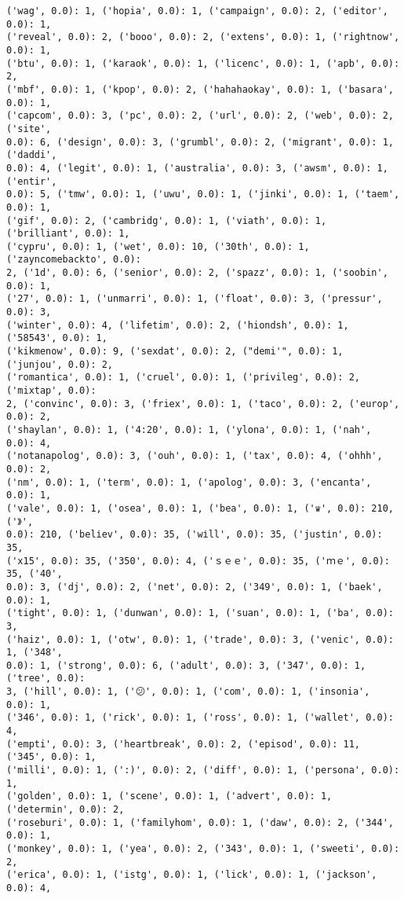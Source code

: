 \documentclass[11pt]{article}
\begin{document}
\begin{Verbatim}[commandchars=\\\{\}]
('wag', 0.0): 1, ('hopia', 0.0): 1, ('campaign', 0.0): 2, ('editor', 0.0): 1,
('reveal', 0.0): 2, ('booo', 0.0): 2, ('extens', 0.0): 1, ('rightnow', 0.0): 1,
('btu', 0.0): 1, ('karaok', 0.0): 1, ('licenc', 0.0): 1, ('apb', 0.0): 2,
('mbf', 0.0): 1, ('kpop', 0.0): 2, ('hahahaokay', 0.0): 1, ('basara', 0.0): 1,
('capcom', 0.0): 3, ('pc', 0.0): 2, ('url', 0.0): 2, ('web', 0.0): 2, ('site',
0.0): 6, ('design', 0.0): 3, ('grumbl', 0.0): 2, ('migrant', 0.0): 1, ('daddi',
0.0): 4, ('legit', 0.0): 1, ('australia', 0.0): 3, ('awsm', 0.0): 1, ('entir',
0.0): 5, ('tmw', 0.0): 1, ('uwu', 0.0): 1, ('jinki', 0.0): 1, ('taem', 0.0): 1,
('gif', 0.0): 2, ('cambridg', 0.0): 1, ('viath', 0.0): 1, ('brilliant', 0.0): 1,
('cypru', 0.0): 1, ('wet', 0.0): 10, ('30th', 0.0): 1, ('zayncomebackto', 0.0):
2, ('1d', 0.0): 6, ('senior', 0.0): 2, ('spazz', 0.0): 1, ('soobin', 0.0): 1,
('27', 0.0): 1, ('unmarri', 0.0): 1, ('float', 0.0): 3, ('pressur', 0.0): 3,
('winter', 0.0): 4, ('lifetim', 0.0): 2, ('hiondsh', 0.0): 1, ('58543', 0.0): 1,
('kikmenow', 0.0): 9, ('sexdat', 0.0): 2, ("demi'", 0.0): 1, ('junjou', 0.0): 2,
('romantica', 0.0): 1, ('cruel', 0.0): 1, ('privileg', 0.0): 2, ('mixtap', 0.0):
2, ('convinc', 0.0): 3, ('friex', 0.0): 1, ('taco', 0.0): 2, ('europ', 0.0): 2,
('shaylan', 0.0): 1, ('4:20', 0.0): 1, ('ylona', 0.0): 1, ('nah', 0.0): 4,
('notanapolog', 0.0): 3, ('ouh', 0.0): 1, ('tax', 0.0): 4, ('ohhh', 0.0): 2,
('nm', 0.0): 1, ('term', 0.0): 1, ('apolog', 0.0): 3, ('encanta', 0.0): 1,
('vale', 0.0): 1, ('osea', 0.0): 1, ('bea', 0.0): 1, ('♛', 0.0): 210, ('》',
0.0): 210, ('beli̇ev', 0.0): 35, ('wi̇ll', 0.0): 35, ('justi̇n', 0.0): 35,
('x15', 0.0): 35, ('350', 0.0): 4, ('ｓｅｅ', 0.0): 35, ('ｍｅ', 0.0): 35, ('40',
0.0): 3, ('dj', 0.0): 2, ('net', 0.0): 2, ('349', 0.0): 1, ('baek', 0.0): 1,
('tight', 0.0): 1, ('dunwan', 0.0): 1, ('suan', 0.0): 1, ('ba', 0.0): 3,
('haiz', 0.0): 1, ('otw', 0.0): 1, ('trade', 0.0): 3, ('venic', 0.0): 1, ('348',
0.0): 1, ('strong', 0.0): 6, ('adult', 0.0): 3, ('347', 0.0): 1, ('tree', 0.0):
3, ('hill', 0.0): 1, ('😕', 0.0): 1, ('com', 0.0): 1, ('insonia', 0.0): 1,
('346', 0.0): 1, ('rick', 0.0): 1, ('ross', 0.0): 1, ('wallet', 0.0): 4,
('empti', 0.0): 3, ('heartbreak', 0.0): 2, ('episod', 0.0): 11, ('345', 0.0): 1,
('milli', 0.0): 1, (':)', 0.0): 2, ('diff', 0.0): 1, ('persona', 0.0): 1,
('golden', 0.0): 1, ('scene', 0.0): 1, ('advert', 0.0): 1, ('determin', 0.0): 2,
('roseburi', 0.0): 1, ('familyhom', 0.0): 1, ('daw', 0.0): 2, ('344', 0.0): 1,
('monkey', 0.0): 1, ('yea', 0.0): 2, ('343', 0.0): 1, ('sweeti', 0.0): 2,
('erica', 0.0): 1, ('istg', 0.0): 1, ('lick', 0.0): 1, ('jackson', 0.0): 4,

\end{Verbatim}
\end{document}
